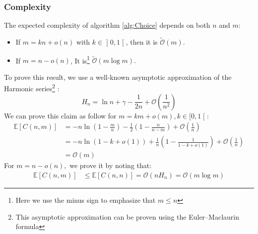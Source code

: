 \subsubsection{Complexity}
The expected complexity of algorithm \ref{alg:Choice} depends on both $n$ and $m$:
\begin{itemize}
	\item If $m=kn+o(n)$ with $k\in\mathopen]0,1\mathclose[$, then it is $\tilde{\mathcal{O}}(m).$
	\item If $m=n-o(n)$, It is\footnote{Here we use the minus sign to emphasize that $m\le n$} $\tilde{\mathcal{O}}(m\log m).$ 
\end{itemize}
To prove this result, we use a well-known asymptotic approximation of the Harmonic series\footnote{This asymptotic approximation can be proven using the Euler–Maclaurin formula} \cite[Section~1.2.11.2]{ArtComputerProgramming}:
$$
H_n=\ln n+\gamma -\frac{1}{2n}+\mathcal{O}\left(\frac{1}{n^2}\right)
$$
We can prove this claim as follow for $m=km+o(m),k\in \mathopen[0,1\mathclose[$:
\begin{align}
	\mathbb{E}[C(n,m)]&=-n\ln \left(1-\frac{m}{n}\right) -\frac{1}{2}\left(1-\frac{n}{n-m}\right)+\mathcal{O}\left(\frac{1}{n}\right) \nonumber \\
&=-n\ln (1-k+o(1))+\frac{1}{n}(1-\tfrac{1}{1-k+o(1)})+\mathcal{O}(\tfrac{1}{n}) \label{eqn:ChoiceBigO} \\
&=\mathcal{O}(m) \nonumber
\end{align}
For $m=n-o(n),$ we prove it by noting that:
\begin{align*}
\mathbb{E}[C(n,m)]&\le\mathbb{E}[C(n,n)]= \mathcal{O} (nH_n) =\mathcal{O}(m\log m)
\end{align*}
\newpage
